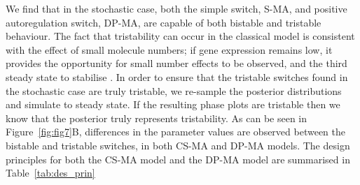 {%


We find that in the stochastic case, both the simple switch, S-MA, and positive autoregulation switch, DP-MA, are capable of both bistable and tristable behaviour. The fact that tristability can occur in the classical model is consistent with the effect of small molecule numbers; if gene expression remains low, it provides the opportunity for small number effects to be observed, and the third steady state to stabilise \autocite{Ma:2012dt}. In order to ensure that the tristable switches found in the stochastic case are truly tristable, we re-sample the posterior distributions and simulate to steady state. If the resulting phase plots are tristable then we know that the posterior truly represents tristability. As can be seen in Figure~\ref{fig:fig7}B, differences in the parameter values are observed between the bistable and tristable switches, in both CS-MA and DP-MA models. The design principles for both the CS-MA model and the DP-MA model are summarised in Table~\ref{tab:des_prin}

}
